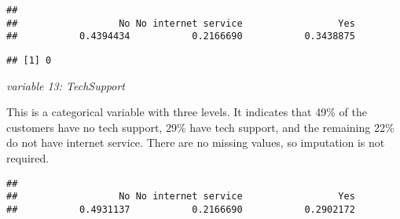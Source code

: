 \documentclass[
  a4paper]{article}
\newenvironment{Shaded}{\begin{snugshade}}{\end{snugshade}}
\newcommand{\CommentTok}[1]{\textcolor[rgb]{0.56,0.35,0.01}{\textit{#1}}}
\newcommand{\FunctionTok}[1]{\textcolor[rgb]{0.13,0.29,0.53}{\textbf{#1}}}
\newcommand{\NormalTok}[1]{#1}
\newcommand{\SpecialCharTok}[1]{\textcolor[rgb]{0.81,0.36,0.00}{\textbf{#1}}}
\begin{document}
\begin{Shaded}
\end{Shaded}

\begin{verbatim}
## 
##                  No No internet service                 Yes 
##           0.4394434           0.2166690           0.3438875
\end{verbatim}

\begin{Shaded}
\end{Shaded}

\begin{verbatim}
## [1] 0
\end{verbatim}

\emph{variable 13: TechSupport}

This is a categorical variable with three levels. It indicates that 49\%
of the customers have no tech support, 29\% have tech support, and the
remaining 22\% do not have internet service. There are no missing
values, so imputation is not required.

\begin{Shaded}
\end{Shaded}

\begin{verbatim}
## 
##                  No No internet service                 Yes 
##           0.4931137           0.2166690           0.2902172
\end{verbatim}

\begin{Shaded}
\end{Shaded}
\end{document}
